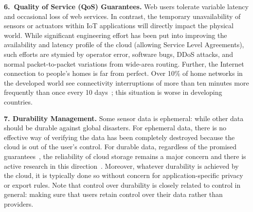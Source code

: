 \noindent\textbf{6.~Quality of Service (QoS) Guarantees.} Web users
tolerate variable latency and occasional loss of web services.  In contrast, the
temporary unavailability of sensors or actuators within IoT applications will
directly impact the physical world.  While significant engineering effort has
been put into improving the availability and latency profile of the cloud
(allowing Service Level Agreements), such efforts are stymied by operator error,
software bugs, DDoS attacks, and normal packet-to-packet variations from
wide-area routing. Further, the Internet connection to people's homes is far
from perfect.  Over 10\% of home networks in the developed world see
connectivity interruptions of more than ten minutes more frequently than once
every 10 days~\cite{grover2013peeking}; this situation is worse in developing
countries.

\noindent\textbf{7. Durability Management.} Some sensor
data is ephemeral: while other data should be durable against global disasters.
For ephemeral data, there is no effective way of verifying the data has been
completely destroyed because the cloud is out of the user's control. For
durable data, regardless of the promised guarantees~\cite{s3durability}, the
reliability of cloud storage remains a major concern and there is active
research in this direction~\cite{bessani2013depsky}.  Moreover, whatever
durability is achieved by the cloud, it is typically done so without concern for
application-specific privacy or export rules.  Note that control over durability
is closely related to control in general: making sure that users retain control
over their data rather than providers.

